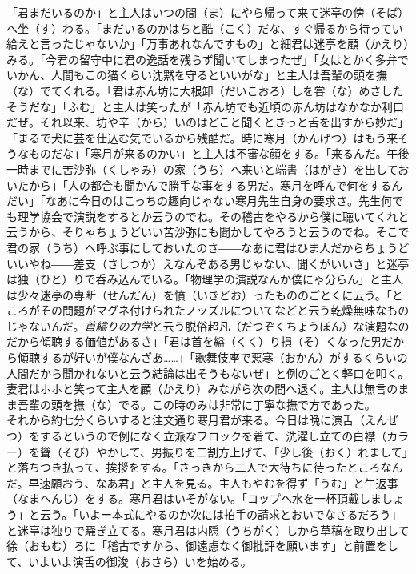 \documentclass{book}
\begin{document}
「君まだいるのか」と主人はいつの間（ま）にやら帰って来て迷亭の傍（そば）へ坐（す）わる。「まだいるのかはちと酷（こく）だな、すぐ帰るから待ってい給えと言ったじゃないか」「万事あれなんですもの」と細君は迷亭を顧（かえり）みる。「今君の留守中に君の逸話を残らず聞いてしまったぜ」「女はとかく多弁でいかん、人間もこの猫くらい沈黙を守るといいがな」と主人は吾輩の頭を撫（な）でてくれる。「君は赤ん坊に大根卸（だいこおろ）しを甞（な）めさしたそうだな」「ふむ」と主人は笑ったが「赤ん坊でも近頃の赤ん坊はなかなか利口だぜ。それ以来、坊や辛（から）いのはどこと聞くときっと舌を出すから妙だ」「まるで犬に芸を仕込む気でいるから残酷だ。時に寒月（かんげつ）はもう来そうなものだな」「寒月が来るのかい」と主人は不審な顔をする。「来るんだ。午後一時までに苦沙弥（くしゃみ）の家（うち）へ来いと端書（はがき）を出しておいたから」「人の都合も聞かんで勝手な事をする男だ。寒月を呼んで何をするんだい」「なあに今日のはこっちの趣向じゃない寒月先生自身の要求さ。先生何でも理学協会で演説をするとか云うのでね。その稽古をやるから僕に聴いてくれと云うから、そりゃちょうどいい苦沙弥にも聞かしてやろうと云うのでね。そこで君の家（うち）へ呼ぶ事にしておいたのさ――なあに君はひま人だからちょうどいいやね――差支（さしつか）えなんぞある男じゃない、聞くがいいさ」と迷亭は独（ひと）りで呑み込んでいる。「物理学の演説なんか僕にゃ分らん」と主人は少々迷亭の専断（せんだん）を憤（いきどお）ったもののごとくに云う。「ところがその問題がマグネ付けられたノッズルについてなどと云う乾燥無味なものじゃないんだ。\emph{首縊りの力学}と云う脱俗超凡（だつぞくちょうぼん）な演題なのだから傾聴する価値があるさ」「君は首を縊（くく）り損（そ）くなった男だから傾聴するが好いが僕なんざあ\ldots{}\ldots{}」「歌舞伎座で悪寒（おかん）がするくらいの人間だから聞かれないと云う結論は出そうもないぜ」と例のごとく軽口を叩く。妻君はホホと笑って主人を顧（かえり）みながら次の間へ退く。主人は無言のまま吾輩の頭を撫（な）でる。この時のみは非常に丁寧な撫で方であった。\\
それから約七分くらいすると注文通り寒月君が来る。今日は晩に演舌（えんぜつ）をするというので例になく立派なフロックを着て、洗濯し立ての白襟（カラー）を聳（そび）やかして、男振りを二割方上げて、「少し後（おく）れまして」と落ちつき払って、挨拶をする。「さっきから二人で大待ちに待ったところなんだ。早速願おう、なあ君」と主人を見る。主人もやむを得ず「うむ」と生返事（なまへんじ）をする。寒月君はいそがない。「コップへ水を一杯頂戴しましょう」と云う。「いよー本式にやるのか次には拍手の請求とおいでなさるだろう」と迷亭は独りで騒ぎ立てる。寒月君は内隠（うちがく）しから草稿を取り出して徐（おもむ）ろに「稽古ですから、御遠慮なく御批評を願います」と前置をして、いよいよ演舌の御浚（おさら）いを始める。\\
\end{document}
